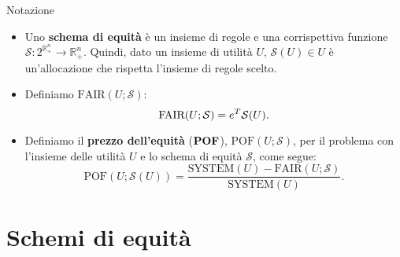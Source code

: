 \documentclass{beamer}
\begin{document}
	\begin{frame}
		\begin{block}{Notazione}
			\begin{itemize}
				\item Uno \textbf{schema di equità} è un insieme di regole e una corrispettiva funzione $\mathcal{S}: 2^{\mathbb{R}^{n}_{+}} \rightarrow \mathbb{R}^{n}_{+}$. Quindi, dato un insieme di utilità $U$, $\mathcal{S}(U) \in U$ è un'allocazione che rispetta l'insieme di regole scelto.\\
				\item Definiamo $\text{FAIR}(U; \mathcal{S})$:
				\vspace{-0.3cm}
				\begin{equation}
					\text{FAIR}(U; \mathcal{S}) = e^T \mathcal{S}(U).
					\vspace{-0.3cm}
				\end{equation}
				\item Definiamo il \textbf{prezzo dell'equità} ($\text{\textbf{POF}}$), $\text{POF}(U; \mathcal{S})$, per il problema con l'insieme delle utilità $U$ e lo schema di equità $\mathcal{S}$, come segue:
				\vspace{-0.3cm}
				\begin{equation}
					\text{POF}(U;\mathcal{S}(U)) = \frac{\text{SYSTEM}(U) - \text{FAIR}(U;\mathcal{S})}{\text{SYSTEM}(U)}.
				\end{equation}
			\end{itemize}
			\vspace{-0.2cm}
		\end{block}
	\end{frame}
	
	\section{Schemi di equità}
	
	
\end{document}
